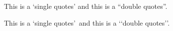 \documentclass{article}
\begin{document}
  This is a `single quotes' and this is a ``double quotes''.
  
  This is a \lq single quotes\rq\ and this is a \lq\lq double quotes\rq\rq.
  
\end{document}
